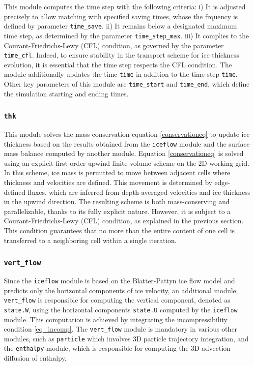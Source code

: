 \documentclass[10pt,twocolumn]{article}
\begin{document}
This module computes the time step with the following criteria:
i) It is adjusted precisely to allow matching with specified saving times, 
whose the frquency is defined by parameter \texttt{time\_save}.
ii) It remains below a designated maximum time step, 
as determined by the parameter \texttt{time\_step\_max}.
iii) It complies to the Courant-Friedrichs-Lewy (CFL) condition, as governed by 
the parameter \texttt{time\_cfl}.
Indeed, to ensure stability in the transport scheme for ice thickness evolution, 
it is essential that the time step respects the CFL condition.
The module additionally updates the time \texttt{time} in addition to the time step 
\texttt{time}. Other key parameters of this module are \texttt{time\_start} 
and \texttt{time\_end}, which define the simulation starting and ending times.

\subsubsection{\texttt{thk}}
\label{module_thk}

This module solves the mass conservation equation \eqref{conservationeq} to update ice 
thickness based on the results obtained from the \texttt{iceflow} module and the 
surface mass balance computed by another module. Equation 
\eqref{conservationeq} is solved using an explicit first-order upwind finite-volume 
scheme on the 2D working grid.
In this scheme, ice mass is permitted to move between adjacent cells where thickness 
and velocities are defined. This movement is determined by edge-defined fluxes, 
which are inferred from depth-averaged velocities and ice thickness in the upwind direction. 
The resulting scheme is both mass-conserving and parallelizable, 
thanks to its fully explicit nature. However, it is subject to a Courant-Friedrichs-Lewy 
(CFL) condition, as explained in the previous section. This condition guarantees 
that no more than the entire content of one cell is transferred to a neighboring cell 
within a single iteration.

\subsubsection{\texttt{vert\_flow}}
\label{module_vertical}

Since the \texttt{iceflow} module is based on the Blatter-Pattyn ice flow model and 
predicts only the horizontal components of ice velocity, an additional module, 
\texttt{vert\_flow} is responsible for computing the vertical component, 
denoted as \texttt{state.W}, using the horizontal components \texttt{state.U} 
computed by the \texttt{iceflow} module. 
This computation is achieved by integrating the incompressibility condition \eqref{eq_incomp}.
The \texttt{vert\_flow} module is mandatory in various other modules, 
such as \texttt{particle} which involves 3D particle trajectory integration, and the 
\texttt{enthalpy} module, which is responsible for computing the 3D advection-diffusion of enthalpy.
\end{document}
